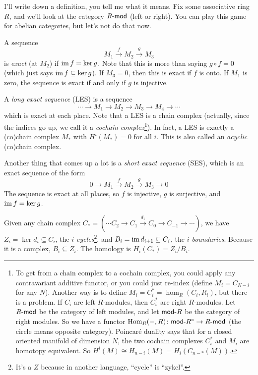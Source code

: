 
I'll write down a definition, you tell me what it means. Fix some associative ring $R$, and we'll look at the category $R\mod$ (left or right). You can play this game for abelian categories, but let's not do that now.

A sequence
\[
 M_1\xrightarrow f M_2 \xrightarrow g M_3
\]
is \emph{exact} (at $M_2$) if $\im f = \ker g$. Note that this is more than saying $g\circ f =0$ (which just says $\im f\subseteq \ker g$). If $M_3=0$, then this is exact if $f$ is onto. If $M_1$ is zero, the sequence is exact if and only if $g$ is injective.

A \emph{long exact sequence} (LES) is a sequence
\[
 \cdots \to M_1\to M_2\to M_3\to M_4\to \cdots
\]
which is exact at each place. Note that a LES is a chain complex (actually, since the indices go up, we call it a \emph{cochain complex}\footnote{To get from a chain complex to a cochain complex, you could apply any contravariant additive functor, or you could just re-index (define $M_i=C_{N-i}$ for any $N$). Another way is to define $M_i=C_i^*=\hom_R(C_i,R_i)$, but there is a problem. If $C_i$ are left $R$-modules, then $C_i^*$ are right $R$-modules. Let $R\mod$ be the category of left modules, and let $\rmod R$ be the category of right modules. So we have a functor $\hom_R(-,R)\colon \rmod R^\circ\to R\mod$ (the circle means opposite category). Poincar\'e duality says that for a closed oriented manifold of dimension $N$, the two cochain complexes $C_i^*$ and $M_i$ are homotopy equivalent. So $H^i(M)\cong H_{n-i}(M)=H_i(C_{n-*}(M))$.}). In fact, a LES is exactly a (co)chain complex $M_*$ with $H^i(M_*)=0$ for all $i$. This is also called an \emph{acyclic} (co)chain complex.

Another thing that comes up a lot is a \emph{short exact sequence} (SES), which is an exact sequence of the form
\[
 0\to M_1\xrightarrow f M_2 \xrightarrow g M_3\to 0
\]
The sequence is exact at all places, so $f$ is injective, $g$ is surjective, and $\im f = \ker g$.

Given any chain complex $C_*=(\cdots C_2\to C_1\xrightarrow{d_1} C_0\to C_{-1}\to \cdots)$, we have $Z_i=\ker d_i\subseteq C_i$, the \emph{$i$-cycles}\footnote{It's a $Z$ because in another language, ``cycle'' is ``zykel''.}, and $B_i=\im d_{i+1}\subseteq C_i$, the \emph{$i$-boundaries}. Because it is a complex, $B_i\subseteq Z_i$. The homology is $H_i(C_*)=Z_i/B_i$.

